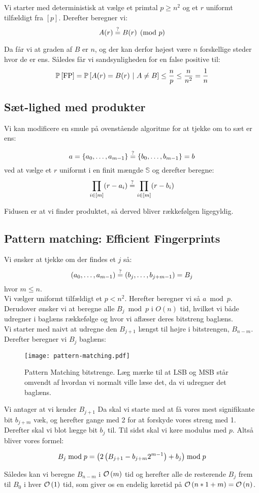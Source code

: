 Vi starter med deterministisk at vælge et primtal $p \geq n^2$ og et $r$ uniformt tilfældigt fra $[p]$. Derefter beregner vi:
$$
  A(r) \stackrel{?}{=} B(r) \pmod p
$$

Da får vi at graden af $B$ er $n$, og der kan derfor højest være $n$ forskellige steder hvor de er ens. Således får vi sandsynligheden for en false positive til:
$$
  \P{\text{FP}}
  = \P{A(r) = B(r) \ | A \neq B}
  \leq \frac{n}{p}
  \leq \frac{n}{n^2}
  = \frac{1}{n}
$$

\subsection{Sæt-lighed med produkter}
Vi kan modificere en smule på ovenstående algoritme for at tjekke om to sæt er ens:

$$
  a = \{a_0, \dots, a_{m-1} \}
  \stackrel{?}{=}
  \{b_0, \dots, b_{m-1} \} = b
$$
ved at vælge et $r$ uniformt i en finit mængde $\mathbb S$ og derefter beregne:
$$
  \prod_{i \in [m]} (r - a_i) \stackrel{?}{=}
  \prod_{i \in [m]} (r - b_i)
$$

Fidusen er at vi finder produktet, så derved bliver rækkefølgen ligegyldig.


\subsection{Pattern matching: Efficient Fingerprints}
Vi ønsker at tjekke om der findes et $j$ så:
$$
  (a_0, \dots, a_{m-1}) \stackrel{?}{=} (b_j, \dots, b_{j+m-1}) = B_j
$$
hvor $m \leq n$.\\

Vi vælger uniformt tilfældigt et $p < n^2$. Herefter beregner vi så $a \bmod p$. Derudover ønsker vi at beregne alle $B_j \bmod p$ i $O(n)$ tid, hvilket vi både udregner i baglæns rækkefølge og hvor vi aflæser deres bitstreng baglæns.\\

Vi starter med naivt at udregne den $B_{j+1}$ længst til højre i bitstrengen, $B_{n-m}$. Derefter beregner vi $B_j$ baglæns:

\begin{figure}[H]
  \begin{center}
  \texttt{[image: pattern-matching.pdf]}
  \end{center}
  \caption{Pattern Matching bitstrenge. Læg mærke til at LSB og MSB står omvendt af hvordan vi normalt ville læse det, da vi udregner det baglæns.}
  \label{fig:pattern}
\end{figure}

Vi antager at vi kender $B_{j+1}$ Da skal vi starte med at få vores mest signifikante bit $b_{j+m}$ væk, og herefter gange med 2 for at forskyde vores streng med 1. Derefter skal vi blot lægge bit $b_j$ til. Til sidst skal vi køre modulus med $p$. Altså bliver vores formel:

$$
  B_{j} \bmod p
  = \left( 2 \left(  B_{j+1} - b_{j+m} 2^{m-1}  \right) + b_j \right) \bmod p
$$

Således kan vi beregne $B_{n-m}$ i $\mathcal{O} \left(  m  \right)$ tid og herefter alle de resterende $B_j$ frem til $B_0$ i hver $\mathcal{O} \left(  1  \right)$ tid, som giver os en endelig køretid på $\mathcal{O} \left(  n*1 + m  \right) = \mathcal{O} \left(  n  \right)$.




